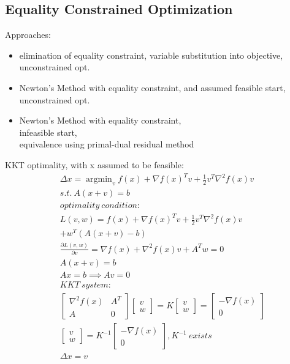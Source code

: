 \documentclass[8pt]{report}
\DeclareMathOperator*{\argmin}{argmin}
\begin{document}
\begin{multicols*}{2}
  \section{Equality Constrained Optimization}
  Approaches:
  \begin{itemize}
  \item elimination of equality constraint, variable substitution into objective, unconstrained opt.
  \item Newton's Method with equality constraint, and assumed feasible start, unconstrained opt.
  \item Newton's Method with equality constraint,\\ infeasible start,\\ equivalence using primal-dual residual method
  \end{itemize}  
  KKT optimality, with x assumed to be feasible:
  \begin{align*}
    &\Delta x = \argmin_v f(x) + \nabla f(x)^T v + \frac{1}{2} v^T \nabla^2 f(x) v\\
    &s.t.\ A(x+v)=b\\
    &optimality\ condition:\\
    &L(v,w) = f(x) + \nabla f(x)^T v + \frac{1}{2} v^T \nabla^2 f(x) v\\
    &+ w^T(A(x+v)-b)\\
    &\frac{\partial L(v,w)}{\partial v} = \nabla f(x) + \nabla^2 f(x) v + A^T w = 0\\
    &A(x+v) = b\\
    &Ax = b \implies Av = 0\\
    & KKT\ system:\\
    &\begin{bmatrix}
        \nabla^2 f(x) & A^T \\
        A & 0 
      \end{bmatrix}
      \begin{bmatrix}
        v\\ w
      \end{bmatrix}=
            K
      \begin{bmatrix}
        v\\ w
      \end{bmatrix} =
    \begin{bmatrix}
        -\nabla f(x)\\
        0
      \end{bmatrix}\\
    &\begin{bmatrix}
        v\\ w
      \end{bmatrix} = K^{-1}
      \begin{bmatrix}
        -\nabla f(x)\\
        0
      \end{bmatrix}, K^{-1}\ exists\\
    &\Delta x = v
  \end{align*}
  

\end{multicols*}
\end{document}
